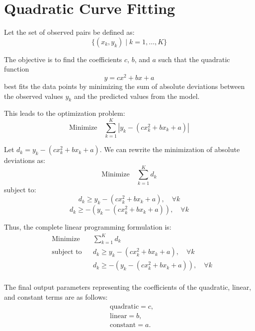 \documentclass{article}
\begin{document}
\section*{Quadratic Curve Fitting}

Let the set of observed pairs be defined as:  
\[
\{(x_k, y_k) \mid k = 1, \ldots, K\}
\]

The objective is to find the coefficients \( c \), \( b \), and \( a \) such that the quadratic function 
\[
y = c x^2 + b x + a
\]
best fits the data points by minimizing the sum of absolute deviations between the observed values \( y_k \) and the predicted values from the model. 

This leads to the optimization problem:
\[
\text{Minimize} \quad \sum_{k=1}^{K} |y_k - (c x_k^2 + b x_k + a)|
\]

Let \( d_k = y_k - (c x_k^2 + b x_k + a) \). We can rewrite the minimization of absolute deviations as:
\[
\text{Minimize} \quad \sum_{k=1}^{K} d_k
\]
subject to:
\[
d_k \geq y_k - (c x_k^2 + b x_k + a), \quad \forall k
\]
\[
d_k \geq -(y_k - (c x_k^2 + b x_k + a)), \quad \forall k
\]

Thus, the complete linear programming formulation is:
\[
\begin{aligned}
& \text{Minimize} && \sum_{k=1}^{K} d_k \\
& \text{subject to} && d_k \geq y_k - (c x_k^2 + b x_k + a), \quad \forall k \\
& & & d_k \geq -(y_k - (c x_k^2 + b x_k + a)), \quad \forall k \\
\end{aligned}
\]

The final output parameters representing the coefficients of the quadratic, linear, and constant terms are as follows:
\[
\begin{aligned}
& \text{quadratic} = c, \\
& \text{linear} = b, \\
& \text{constant} = a.
\end{aligned}
\]
\end{document}
